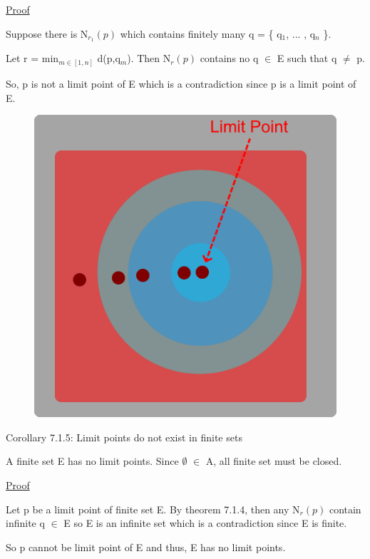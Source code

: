 { \color{magenta} \underline{Proof} } 
	
	Suppose there is N$_{r_1}(p)$ which contains finitely many q = \{ q$_1$, ... , q$_n$ \}.

	Let r = min$_{m \in [1,n]}$ d(p,q$_m$). Then N$_r(p)$ contains no q $\in$ E such that q $\not =$ p.

	So, p is not a limit point of E which is a contradiction since p is a limit point of E.

\begin{figure}[h]
	\centering
	\includegraphics[scale=0.31]{Images/7.1.4.png}
\end{figure}

{ \color{orange} Corollary 7.1.5: Limit points do not exist in finite sets } 
	
	\begin{adjustbox}{minipage=14cm, right, vspace=0.1cm 0cm}
		A finite set E has no limit points.
		Since $\emptyset$ $\in$ A, all finite set must be closed.
	\end{adjustbox}

{ \color{magenta} \underline{Proof} } 

	Let p be a limit point of finite set E. By {\color{red} theorem 7.1.4}, 
	then any N$_r(p)$ contain infinite q $\in$ E so E is an infinite set
	which is a contradiction since E is finite.

	So p cannot be limit point of E and thus, E has no limit points. \\

